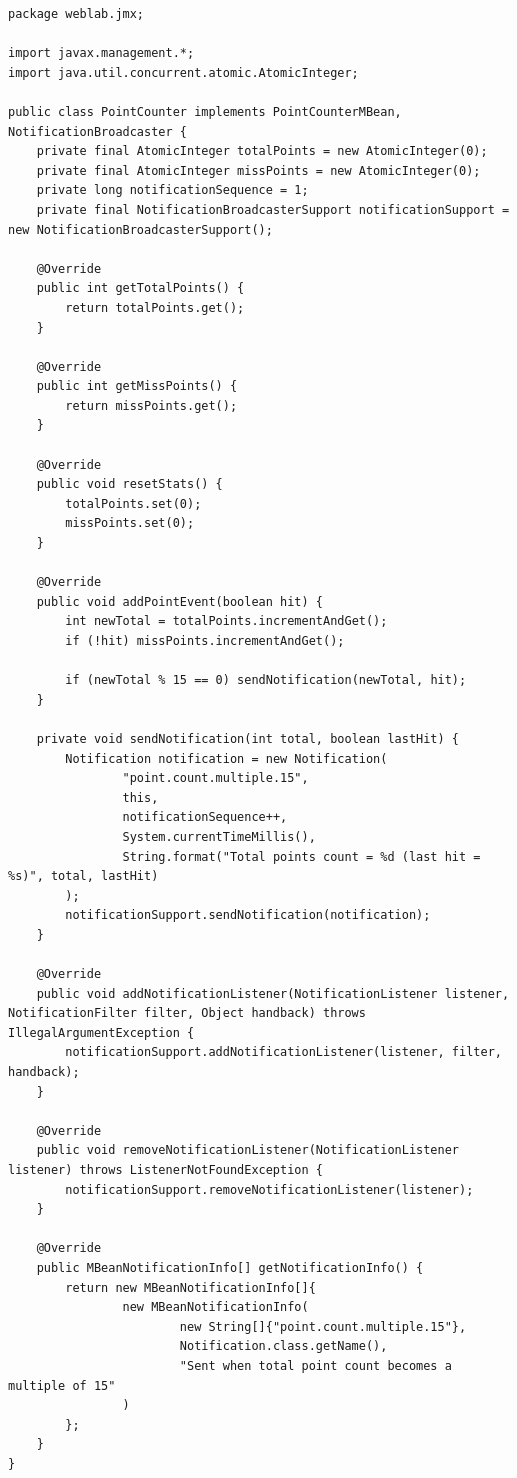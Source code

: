 \begin{lstlisting}[caption=Листинг реализации \texttt{PointCounter}.]
package weblab.jmx;

import javax.management.*;
import java.util.concurrent.atomic.AtomicInteger;

public class PointCounter implements PointCounterMBean, NotificationBroadcaster {
    private final AtomicInteger totalPoints = new AtomicInteger(0);
    private final AtomicInteger missPoints = new AtomicInteger(0);
    private long notificationSequence = 1;
    private final NotificationBroadcasterSupport notificationSupport = new NotificationBroadcasterSupport();

    @Override
    public int getTotalPoints() {
        return totalPoints.get();
    }

    @Override
    public int getMissPoints() {
        return missPoints.get();
    }

    @Override
    public void resetStats() {
        totalPoints.set(0);
        missPoints.set(0);
    }

    @Override
    public void addPointEvent(boolean hit) {
        int newTotal = totalPoints.incrementAndGet();
        if (!hit) missPoints.incrementAndGet();

        if (newTotal % 15 == 0) sendNotification(newTotal, hit);
    }

    private void sendNotification(int total, boolean lastHit) {
        Notification notification = new Notification(
                "point.count.multiple.15",
                this,
                notificationSequence++,
                System.currentTimeMillis(),
                String.format("Total points count = %d (last hit = %s)", total, lastHit)
        );
        notificationSupport.sendNotification(notification);
    }

    @Override
    public void addNotificationListener(NotificationListener listener, NotificationFilter filter, Object handback) throws IllegalArgumentException {
        notificationSupport.addNotificationListener(listener, filter, handback);
    }

    @Override
    public void removeNotificationListener(NotificationListener listener) throws ListenerNotFoundException {
        notificationSupport.removeNotificationListener(listener);
    }

    @Override
    public MBeanNotificationInfo[] getNotificationInfo() {
        return new MBeanNotificationInfo[]{
                new MBeanNotificationInfo(
                        new String[]{"point.count.multiple.15"},
                        Notification.class.getName(),
                        "Sent when total point count becomes a multiple of 15"
                )
        };
    }
}
\end{lstlisting}

